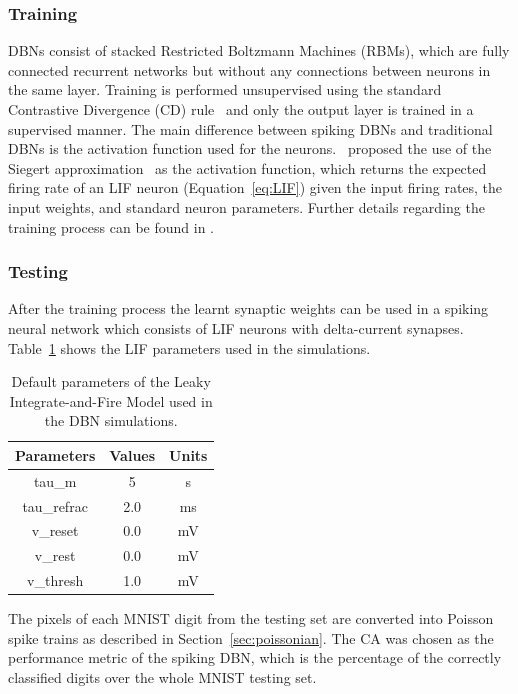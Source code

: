 \documentclass{frontiersENG} %
\begin{document}
\subsubsection{Training}

DBNs consist of stacked Restricted Boltzmann Machines (RBMs), which are fully connected recurrent networks but without any connections between neurons in the same layer. Training is performed unsupervised using the standard Contrastive Divergence (CD) rule~\citep{hinton2006fast} and only the output layer is trained in a supervised manner. The main difference between spiking DBNs and traditional DBNs is the activation function used for the neurons.~\cite{o2013real} proposed the use of the Siegert approximation~\citep{Jug_etal_2012} as the activation function, which returns the expected firing rate of an LIF neuron (Equation~\ref{eq:LIF}) given the input firing rates, the input weights, and standard neuron parameters. Further details regarding the training process can be found in \citet{o2013real}.

\subsubsection{Testing}
After the training process the learnt synaptic weights can be used in a spiking neural network which consists of LIF neurons with delta-current synapses. Table~\ref{Tab:NeuralParams} shows the LIF parameters used in the simulations.

\begin{table}[hbbp]
	\centering
	\caption{\label{Tab:NeuralParams}Default parameters of the Leaky Integrate-and-Fire Model used in the DBN simulations.}
	\bgroup
	\def\arraystretch{1.3}
	\begin{tabular}{c c c}
		Parameters & Values & Units \\
		\hline
		tau\_m & 5 & s\\
		tau\_refrac & 2.0 & ms\\
		v\_reset & 0.0 & mV\\
		v\_rest & 0.0 & mV\\
		v\_thresh & 1.0 & mV\\
	\end{tabular}
	\egroup
\end{table}

The pixels of each MNIST digit from the testing set are converted into Poisson spike trains as described in Section~\ref{sec:poissonian}. %
The CA was chosen as the performance metric of the spiking DBN, which is the percentage of the correctly classified digits over the whole MNIST testing set.
\end{document}
